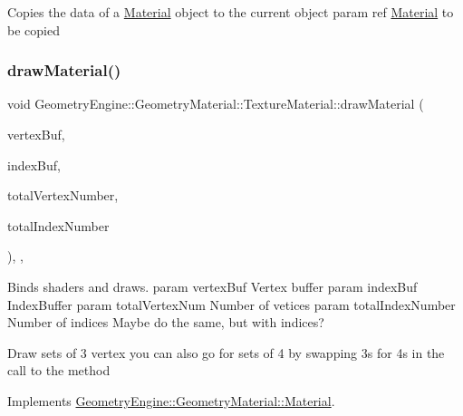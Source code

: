 Copies the data of a \mbox{\hyperlink{class_geometry_engine_1_1_geometry_material_1_1_material}{Material}} object to the current object param ref \mbox{\hyperlink{class_geometry_engine_1_1_geometry_material_1_1_material}{Material}} to be copied \mbox{\label{class_geometry_engine_1_1_geometry_material_1_1_texture_material_a7bb3c956fa64e47b251d882890c931f9}} 
\subsubsection{\texorpdfstring{drawMaterial()}{drawMaterial()}}
{\footnotesize\ttfamily void Geometry\+Engine\+::\+Geometry\+Material\+::\+Texture\+Material\+::draw\+Material (\begin{DoxyParamCaption}\item[{Q\+Open\+G\+L\+Buffer $\ast$}]{vertex\+Buf,  }\item[{Q\+Open\+G\+L\+Buffer $\ast$}]{index\+Buf,  }\item[{unsigned int}]{total\+Vertex\+Number,  }\item[{unsigned int}]{total\+Index\+Number }\end{DoxyParamCaption})\hspace{0.3cm}{\ttfamily [override]}, {\ttfamily [protected]}, {\ttfamily [virtual]}}

Binds shaders and draws. param vertex\+Buf Vertex buffer param index\+Buf Index\+Buffer param total\+Vertex\+Num Number of vetices param total\+Index\+Number Number of indices Maybe do the same, but with indices?

Draw sets of 3 vertex you can also go for sets of 4 by swapping 3s for 4s in the call to the method 

Implements \mbox{\hyperlink{class_geometry_engine_1_1_geometry_material_1_1_material_a0070eab6e5fe86dc05dc69f2e37b9072}{Geometry\+Engine\+::\+Geometry\+Material\+::\+Material}}.

\mbox{\label{class_geometry_engine_1_1_geometry_material_1_1_texture_material_afbf7007e9d869b23dfbc173841ba5b34}} 
